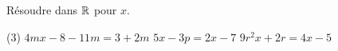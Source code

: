 \documentclass[a4paper,12pt]{report}
\begin{document}
\begin{boiteExT}
	\vspace{8cm}

\end{boiteExT}


\begin{boiteExT}
	\vspace{6cm}

\end{boiteExT}

\begin{boiteExT}[Exemple 1 $(k+2)x=8$]
	\vspace{6cm}

\end{boiteExT}


\begin{boiteExT}[Exemple 2 $a(x-3)=5a$]
	\vspace{6cm}

\end{boiteExT}

\begin{boiteExT}[Exemple 3 $(p-1)x+3=3x$] 
	\vspace{6cm}

\end{boiteExT}

\begin{boiteExT}[Exemple 4 $(m+3)x+7=mx+10$]
	\vspace{6cm}

\end{boiteExT}
\begin{exo}
Résoudre dans $\mathbb R$ pour $x$.
\begin{tasks}(3)
	\task $4 m x-8-11 m=3+2 m$
	\task $5x-3p=2x-7$
	\task $9r^2x+2r=4x-5$
\end{tasks}
\end{exo}
\end{document}

